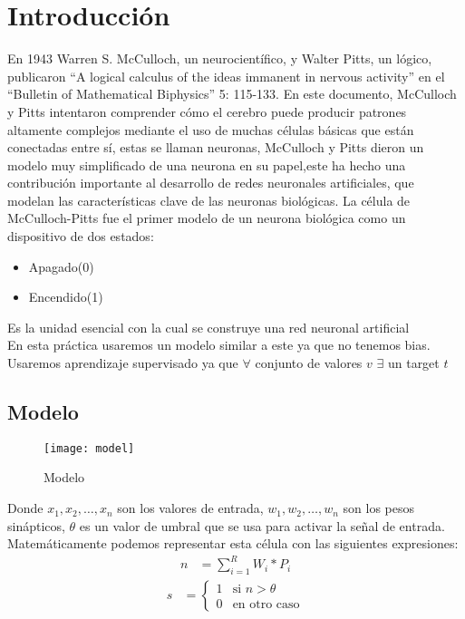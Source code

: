 \documentclass{article}
\begin{document}
\maketitle
\tableofcontents
\section{Introducción}
En 1943 Warren S. McCulloch, un neurocientífico, y Walter Pitts, un lógico, publicaron ``A logical calculus of the ideas immanent in nervous activity'' en el ``Bulletin of Mathematical Biphysics'' 5: 115-133. En este documento, McCulloch y Pitts intentaron comprender cómo el cerebro puede producir patrones altamente complejos mediante el uso de muchas células básicas que están conectadas entre sí, estas se llaman neuronas, McCulloch  y Pitts dieron un modelo muy simplificado de una neurona en su papel,este ha hecho una contribución importante al desarrollo de redes neuronales artificiales, que modelan las características clave de las neuronas biológicas.
La célula de McCulloch-Pitts fue el primer modelo de un neurona biológica como un dispositivo de dos estados:
\begin{itemize}
	\item Apagado(0)
	\item Encendido(1)
\end{itemize}
Es la unidad esencial con la cual se construye una red neuronal artificial\\
En esta práctica usaremos un modelo similar a este ya que no tenemos bias. Usaremos aprendizaje supervisado ya que $\forall$ conjunto de valores $v$ $\exists$ un target $t$
\subsection{Modelo}
\begin{figure}[h!]
	\caption{Modelo}
	\centering
	\texttt{[image: model]}
\end{figure}
Donde $x_1, x_2,\ldots, x_n$ son los valores de entrada, $w_1, w_2,\ldots, w_n$ son los pesos sinápticos, $\theta$ es un valor de umbral que se usa para activar la señal de entrada.\\
Matemáticamente podemos representar esta célula con las siguientes expresiones:\\
\begin{align}
	n &= \sum_{i=1}^{R}W_i*P_i
\end{align}
\begin{align}
	s &{}=\displaystyle
	\begin{cases}
		1 &\text{si } n > \theta\\
		0 &\text{en otro caso}
	\end{cases}
\end{align}
\newpage
\end{document}
